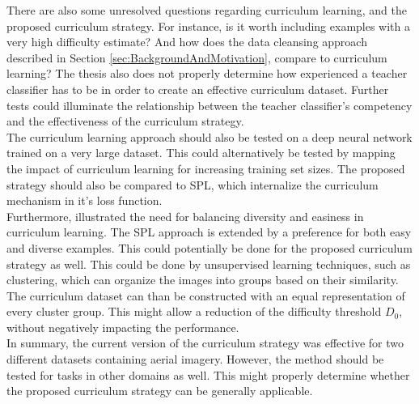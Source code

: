 There are also some unresolved questions regarding curriculum learning, and the proposed curriculum strategy. For instance, is it worth including examples with a very high difficulty estimate? And how does the data cleansing approach described in Section \ref{sec:BackgroundAndMotivation}, compare to curriculum learning? The thesis also does not properly determine how experienced a teacher classifier has to be in order to create an effective curriculum dataset. Further tests could illuminate the relationship between the teacher classifier's competency and the effectiveness of the curriculum strategy.  \\

The curriculum learning approach should also be tested on a deep neural network trained on a very large dataset. This could alternatively be tested by mapping the impact of curriculum learning for increasing training set sizes. The proposed strategy should also be compared to \ac{SPL}\citep{Kumar_self_paced_learning}, which internalize the curriculum mechanism in it's loss function.\\

Furthermore, \cite{Lu_self-paced_learning_diversity} illustrated the need for balancing diversity and easiness in curriculum learning. The \ac{SPL} approach is extended by a preference for both easy and diverse examples. This could potentially be done for the proposed curriculum strategy as well. This could be done by unsupervised learning techniques, such as clustering, which can organize the images into groups based on their similarity. The curriculum dataset can than be constructed with an equal representation of every cluster group. This might allow a reduction of the difficulty threshold $D_0$, without negatively impacting the performance.\\

In summary, the current version of the curriculum strategy was effective for two different datasets containing aerial imagery. However, the method should be tested for tasks in other domains as well. This might properly determine whether the proposed curriculum strategy can be generally applicable.\\
 

